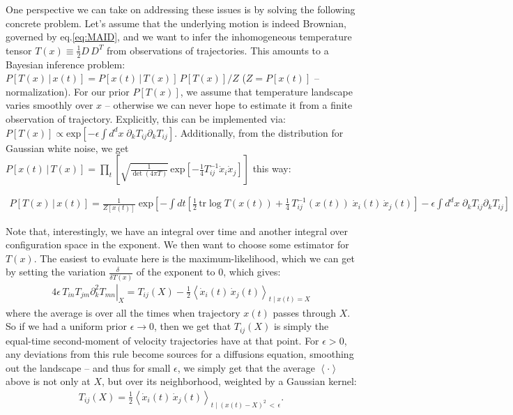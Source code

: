 \documentclass[reprint,prx]{revtex4-1}
\newcommand{\fd}[2]{\frac{\delta #1}{\delta #2}} %
\newcommand{\tr}{\mbox{tr}}
\renewcommand{\=}[1]{\stackrel{#1}{=}} %
\renewcommand{\(}{\left (}
\renewcommand{\)}{\right  )}
\renewcommand{\[}{\left [}
\renewcommand{\]}{\right ]}
\newcommand{\<}{\left <}
\renewcommand{\>}{\right >}
\theoremstyle{definition}
\theoremstyle{remark}
\renewcommand{\exp}[1]{\mbox{exp}\[#1\]} %
\begin{document}
One perspective we can take on addressing these issues is by solving the following concrete problem. Let's assume that the underlying motion is indeed Brownian, governed by eq.\ref{eq:MAID}, and we want to infer the inhomogeneous temperature tensor $ T(x) \equiv \frac{1}{2} D\, D^T $ from observations of trajectories. This amounts to a Bayesian inference problem: $ P\[T(x)\,|\,x(t)\]= P\[x(t)\,|\,T(x)\]\, P\[T(x)\]/Z $ ($ Z = P[x(t)] $ -- normalization). For our prior $ P\[T(x)\] $, we assume that temperature landscape varies smoothly over $ x $ -- otherwise we can never hope to estimate it from a finite observation of trajectory. Explicitly, this can be implemented via: $ P\[T(x)\] \propto \exp{-\epsilon \int d^d x\; \partial_k T_{ij} \partial_k T_{ij}}$. Additionally, from the distribution for Gaussian white noise, we get $ P\[x(t)\,|\,T(x)\] = \prod_t \[ \sqrt{\frac{1}{\det(4\pi T)}}\,\exp{-\frac{1}{4} T^{-1}_{ij}\dot{x}_i \dot{x}_j} \]$ this way:
\begin{widetext}
\begin{align*}
 P\[T(x)\,|\,x(t)\] = \frac{1}{Z[x(t)]} \; \exp{-\int dt \[\frac{1}{2}\, \tr \log T(x(t)) + \frac{1}{4}\, T^{-1}_{ij}(x(t))\;\dot{x}_i(t)\,  \dot{x}_j(t)\]-\epsilon \int d^d x\; \partial_k T_{ij}\partial_k T_{ij}}
\end{align*}
\end{widetext}
Note that, interestingly, we have an integral over time and another integral over configuration space in the exponent. We then want to choose some estimator for $ T(x) $. The easiest to evaluate here is the maximum-likelihood, which we can get by setting the variation $ \fd{\quad}{T(x)} $ of the exponent to 0, which gives:
\begin{align*}
4\epsilon\, \left. T_{in}T_{jm} \partial_k^2 T_{mn}\right|_X = T_{ij}(X) - \frac{1}{2}\<\dot{x}_i(t)\,  \dot{x}_j(t)\>_{t\; |\;x(t)=X}
\end{align*}
where the average is over all the times when trajectory $ x(t) $ passes through $ X $. So if we had a uniform prior $ \epsilon\rightarrow 0 $, then we get that $ T_{ij}(X) $ is simply the equal-time second-moment of velocity trajectories have at that point. For $ \epsilon>0 $, any deviations from this rule become sources for a diffusions equation, smoothing out the landscape -- and thus for small $ \epsilon $, we simply get that the average $ \<\cdot\> $ above is not only at $ X $, but over its neighborhood, weighted by a Gaussian kernel: 
\begin{align} \label{eq:Tij}
T_{ij}(X) = \frac{1}{2}\<\dot{x}_i(t)\,  \dot{x}_j(t)\>_{t\; |\;(x(t)-X)^2 \,<\, \epsilon}.
\end{align} 
\end{document}
